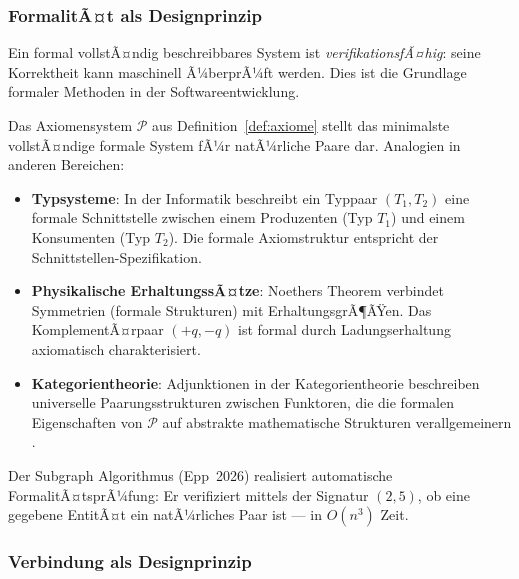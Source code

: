 ﻿\documentclass[a4paper,12pt]{article}
\theoremstyle{definition}
\begin{document}
\subsubsection*{FormalitÃ¤t als Designprinzip}

Ein formal vollstÃ¤ndig beschreibbares System ist \emph{verifikations\-fÃ¤hig}:
seine Korrektheit kann maschinell Ã¼berprÃ¼ft werden. Dies ist die Grundlage formaler
Methoden in der Softwareentwicklung.

Das Axiomensystem $\mathcal{P}$ aus Definition~\ref{def:axiome} stellt das minimalste
vollstÃ¤ndige formale System fÃ¼r natÃ¼rliche Paare dar.
Analogien in anderen Bereichen:
\begin{itemize}
	\item \textbf{Typsysteme}: In der Informatik beschreibt ein Typpaar $(T_1, T_2)$
	eine formale Schnittstelle zwischen einem Produzenten (Typ $T_1$) und einem
	Konsumenten (Typ $T_2$). Die formale Axiomstruktur entspricht der
	Schnittstellen-Spezifikation.
	\item \textbf{Physikalische ErhaltungssÃ¤tze}: Noethers Theorem verbindet
	Symmetrien (formale Strukturen) mit ErhaltungsgrÃ¶ÃŸen. Das KomplementÃ¤rpaar
	$(+q, -q)$ ist formal durch Ladungserhaltung axiomatisch charakterisiert.
	\item \textbf{Kategorientheorie}: Adjunktionen in der Kategorientheorie
	beschreiben universelle Paarungsstrukturen zwischen Funktoren, die die
	formalen Eigenschaften von $\mathcal{P}$ auf abstrakte mathematische
	Strukturen verallgemeinern \cite{weyl1952}.
\end{itemize}

Der Subgraph Algorithmus (Epp~2026) realisiert automatische FormalitÃ¤tsprÃ¼fung:
Er verifiziert mittels der Signatur $(2, 5)$, ob eine gegebene EntitÃ¤t ein
natÃ¼rliches Paar ist --- in $O(n^3)$ Zeit.

\subsubsection*{Verbindung als Designprinzip}
\end{document}

